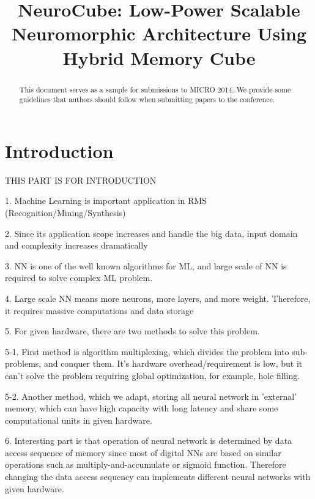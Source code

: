 \documentclass[pageno]{jpaper}
\begin{document}
\title{NeuroCube: Low-Power Scalable Neuromorphic Architecture Using Hybrid Memory Cube}


\date{}
\maketitle

\thispagestyle{empty}

\begin{abstract}
This document serves as a sample for submissions to MICRO 2014.
We provide some guidelines that authors should follow when submitting papers to
the conference.
\end{abstract}

\section{Introduction}\label{sec:Introduction}

THIS PART IS FOR INTRODUCTION

1. Machine Learning is important application in RMS (Recognition/Mining/Synthesis)

2. Since its application scope increases and handle the big data, input domain and complexity increases dramatically

3. NN is one of the well known algorithms for ML, and large scale of NN is required to solve complex ML problem.

4. Large scale NN means more neurons, more layers, and more weight. Therefore, it requires massive computations and data storage

5. For given hardware, there are two methods to solve this problem.

5-1. First method is algorithm multiplexing, which divides the problem into sub-problems, and conquer them. It's hardware overhead/requirement is low, but it can't solve the problem requiring global optimization, for example, hole filling.

5-2. Another method, which we adapt, storing all neural network in 'external' memory, which can have high capacity with long latency and share some computational units in given hardware.

6. Interesting part is that operation of neural network is determined by data access sequence of memory since most of digital NNs are based on similar operations such as multiply-and-accumulate or sigmoid function. Therefore changing the data access sequency can implements different neural networks with given hardware.
\end{document}
